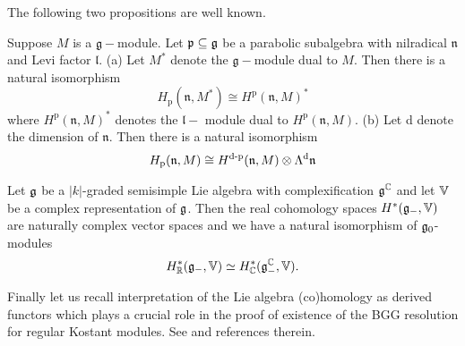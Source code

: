 The following two propositions are well known.

\begin{proposition}
Suppose $M$ is a $\mathfrak{g-}$module. Let $\mathfrak{p}\subseteq \mathfrak{%
g}$ be a parabolic subalgebra with nilradical $\mathfrak{n}$ and Levi factor
$\mathfrak{l}$. \newline
(a) Let $M^{\ast }$ denote the $\mathfrak{g}-$module dual to $M.$ Then there
is a natural isomorphism
\begin{equation*}
H_{\text{p}}(\mathfrak{n},M^{\ast })\cong H^{\text{p}}(\mathfrak{n},M)^{\ast
}
\end{equation*}%
where $H^{\text{p}}(\mathfrak{n},M)^{\ast }$ denotes the $\mathfrak{l-}$%
module dual to $H^{\text{p}}(\mathfrak{n},M)$.\newline
(b) Let d denote the dimension of $\mathfrak{n}$. Then there is a natural
isomorphism
\begin{equation*}
H_{\text{p}}(\mathfrak{n},M)\cong H^{\text{d-p}}(\mathfrak{n},M)\otimes
\Lambda ^{\text{d}}\mathfrak{n}\newline
\end{equation*}
\end{proposition}




\begin{proposition}
 Let $\mathfrak{g}$ be a $|k|$-graded semisimple Lie algebra with complexification $\mathfrak{g}^{\mathbb{C}}$ and let $\mathbb{V}$ be a complex representation of $\mathfrak{g}$. Then the real cohomology spaces $H^*(\mathfrak{g}_-,\mathbb{V})$ are 	naturally complex vector spaces and we have a natural isomorphism of $\mathfrak{g}_0$-modules
 \[
  H_{\mathbb{R}}^*(\mathfrak{g}_-,\mathbb{V}) \simeq H_{\mathbb{C}}^*(\mathfrak{g}_-^{\mathbb{C}},\mathbb{V}).
 \]

\end{proposition}




Finally let us recall interpretation of the Lie algebra (co)homology as derived functors which plays a crucial role in the proof of existence of the BGG resolution for regular Kostant modules. See \cite{enright_diagrams_2014, boe_kostant_2009} and references therein. 

